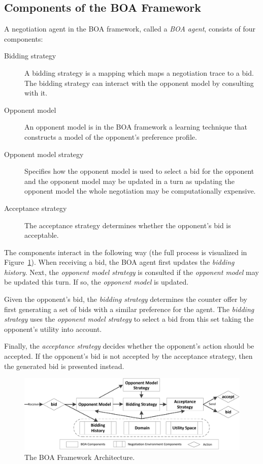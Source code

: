 \documentclass[]{article}
\begin{document}
\subsection{Components of the BOA Framework}
A negotiation agent in the BOA framework, called a \textit{BOA agent}, consists of four components:
\begin{description}
  \item[Bidding strategy] A bidding strategy is a mapping which maps a negotiation trace to a bid. The bidding strategy can interact with the opponent model by consulting with it.%

  \item[Opponent model] An opponent model is in the BOA framework a learning technique that constructs a model of the opponent's preference profile.%
  \item[Opponent model strategy] Specifies how the opponent model is used to select a bid for the opponent and the opponent model may be updated in a turn as updating the opponent model the whole negotiation may be computationally expensive.
  \item[Acceptance strategy] The acceptance strategy determines whether the opponent's bid is acceptable.
\end{description}
The components interact in the following way (the full process is visualized in Figure~\ref{fig:flowchart}). When receiving a bid, the BOA agent first  updates the \textit{bidding history}. Next, the \textit{opponent model strategy} is consulted if the \textit{opponent model} may be updated this turn. If so, the \textit{opponent model} is updated.

Given the opponent's bid, the \textit{bidding strategy} determines the counter offer by first generating a set of bids with a similar preference for the agent. The \textit{bidding strategy} uses the \textit{opponent model strategy} to select a bid from this set taking the opponent's utility into account.

Finally, the \textit{acceptance strategy} decides whether the opponent's action should be accepted. If the opponent's bid is not accepted by the acceptance strategy, then the generated bid is presented instead.

\begin{figure}[t] 
	\center
	\includegraphics[width=15.0cm]{media/BOAflow.png}
	\caption{The BOA Framework Architecture.}
	\label{fig:flowchart}
\end{figure}
\pagebreak
\end{document}
